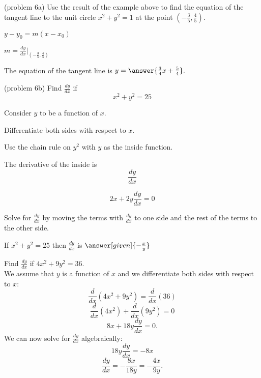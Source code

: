 \documentclass{ximera}
\begin{document}
\begin{center}
\begin{foldable}
\end{foldable}
\end{center}

\begin{problem}(problem 6a)
Use the result of the example above to find the equation of the tangent line to the unit circle $x^2 + y^2 = 1$ at the point $(-\tfrac35,\tfrac45).$

\begin{hint}
$y-y_0 = m(x-x_0)$
\end{hint}
\begin{hint}
$m = \frac{dy}{dx}\bigg|_{(-\frac35, \frac45)}$
\end{hint}
The equation of the tangent line is $y = \answer{\frac34 x+\frac54}.$
\end{problem}


\begin{problem}(problem 6b)
  Find $\frac{dy}{dx}$ if
  \[
  x^2 + y^2 = 25
  \]
  
	  
    \begin{hint}
      Consider $y$ to be a function of $x$.
    \end{hint}
		\begin{hint}
		  Differentiate both sides with respect to $x$.
		\end{hint}
    \begin{hint}
      Use the chain rule on $y^2$ with $y$ as the inside function.
    \end{hint}
    \begin{hint}
      The derivative of the inside is 
      \[
      \frac{dy}{dx}
      \]
    \end{hint}
		\begin{hint}
		  \[
			2x + 2y\frac{dy}{dx} = 0
			\]
		\end{hint}
		\begin{hint}
		  Solve for $\frac{dy}{dx}$ by moving the terms with $\frac{dy}{dx}$
			to one side and the 
			rest of the terms to the other side.
		\end{hint}
    
		If $x^2 + y^2 = 25$ then $\frac{dy}{dx}$ is
		 $\answer[given]{-\frac{x}{y}}$
		
\end{problem}




\begin{example}[example 7]
Find  $\frac{dy}{dx}$ if $4x^2 + 9y^2 = 36$.\\
We assume that $y$ is a function of $x$ and we differentiate both 
sides with respect to $x$:
\[\frac{d}{dx}(4x^2 + 9y^2)  = \frac{d}{dx} (36)\]
\[\frac{d}{dx}(4x^2) + \frac{d}{dx} (9y^2) = 0\]
\[8x + 18y\frac{dy}{dx} = 0.\]
We can now solve for $\displaystyle{\frac{dy}{dx}}$ algebraically:
\[18y\frac{dy}{dx} = -8x\]
\[\frac{dy}{dx} = -\frac{8x}{18y}= -\frac{4x}{9y}.\]
\end{example}
\end{document}
